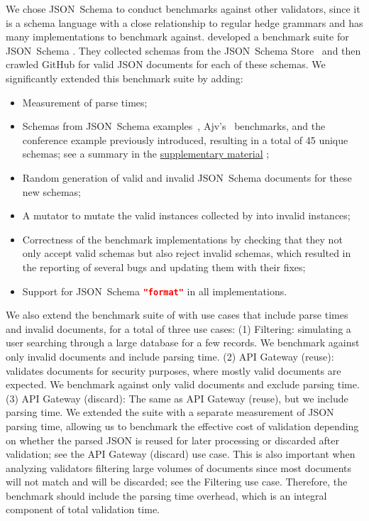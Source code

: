\documentclass[acmsmall,%
  screen,%
  authorversion, %
  nonacm%
]{acmart}
\newcommand{\JSONSchema}{%
  JSON~Schema\xspace%
}
\newcommand{\supplementarymaterial}{%
  \hyperref[supplementary_material]{supplementary material}\xspace%
}
\newcommand{\GitHub}{%
  GitHub\xspace%
}
\newcommand{\format}{%
  \lstinline[language=json]|"format"|\xspace%
}
\newcommand{\JSON}{\ac{JSON}\xspace}
\begin{document}
We chose \JSONSchema to conduct benchmarks against other validators, since it is a schema language with a close relationship to regular hedge grammars and has many implementations to benchmark against.
\citet{blaze} developed a benchmark suite for \JSONSchema.
They collected schemas from the \JSONSchema Store~\cite{schemastore} and then crawled \GitHub for valid \JSON documents for each of these schemas.
We significantly extended this benchmark suite by adding:
\begin{itemize}
\item Measurement of parse times;
\item Schemas from \JSONSchema examples~\cite{jsonschemaexamples}, Ajv's~\cite{jsonschema_impl_ajv} benchmarks, and the conference example previously introduced, resulting in a total of 45 unique schemas; see a summary in the \supplementarymaterial;
\item Random generation of valid and invalid \JSONSchema documents for these new schemas;
\item A mutator to mutate the valid instances collected by \citet{blaze} into invalid instances;
\item Correctness of the benchmark implementations by checking that they not only accept valid schemas but also reject invalid schemas, which resulted in the reporting of several bugs and updating them with their fixes;
\item Support for \JSONSchema \format in all implementations.
\end{itemize}
We also extend the benchmark suite of \cite{blaze} with use cases that include parse times and invalid documents, for a total of three use cases: (1) Filtering: simulating a user searching through a large database for a few records. We benchmark against only invalid documents and include parsing time.
(2) API Gateway (reuse): validates documents for security purposes, where mostly valid documents are expected. We benchmark against only valid documents and exclude parsing time.
(3) API Gateway (discard): The same as API Gateway (reuse), but we include parsing time.
We extended the suite with a separate measurement of \JSON parsing time, allowing us to benchmark the effective cost of validation depending on whether the parsed \JSON is reused for later processing or discarded after validation; see the API Gateway (discard) use case.
This is also important when analyzing validators filtering large volumes of documents since most documents will not match and will be discarded; see the Filtering use case. 
Therefore, the benchmark should include the parsing time overhead, which is an integral component of total validation time.
\end{document}
